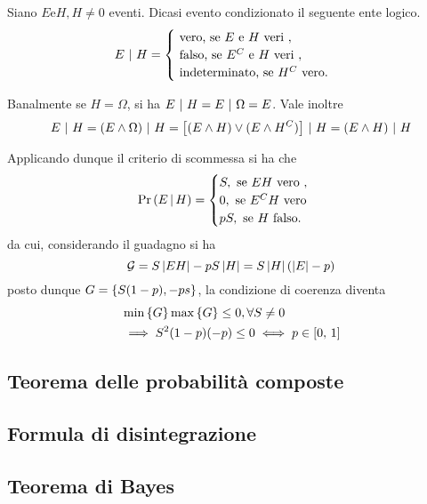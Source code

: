 \documentclass{subfiles}
\begin{document}
\begin{Definition*}
    Siano \(E \text{e} H, H \neq 0\) eventi.
    Dicasi evento condizionato il seguente ente logico.
    \[E \Given H = \begin{cases}
            \text{vero, se} E \text{e} H \text{veri},      \\
            \text{falso, se} E^{C} \text{e} H \text{veri}, \\
            \text{indeterminato, se} H^{C} \text{vero.}
        \end{cases}\]
\end{Definition*}

Banalmente se \(H = \Omega\), si ha \(E \operatorname{\, \vert \,} H = E \operatorname{\, \vert \,} \Omega = E\).
Vale inoltre
\[
    E \operatorname{\, \vert \,} H = (E \land \Omega) \operatorname{\, \vert \,} H = \left[(E \land H) \lor (E \land H^{C})\right] \operatorname{\, \vert \,} H = (E \land H) \operatorname{\, \vert \,} H
\]

Applicando dunque il criterio di scommessa si ha che
\[
    \Prob{E}[H] = \begin{cases}
        S, \text{se} EH \text{vero},    \\
        0, \text{se} E^{C}H \text{vero} \\
        pS, \text{se} H \text{falso.}
    \end{cases}\]
da cui, considerando il guadagno si ha
\[
    \mathcal{G} = S \left\vert EH \right\vert - pS\left\vert H \right\vert = S\left\vert H \right\vert (\left\vert E \right\vert - p)
\]
posto dunque \(G = \Set{S(1 - p), -ps}\), la condizione di coerenza diventa
\[\begin{aligned}
         & \Min{G}\Max{G} \le 0, \forall S \neq 0                   \\
         & \implies S^{2}(1 - p)(-p) \le 0 \iff p \in \Range*{0}{1}
    \end{aligned}\]

\subsection{Teorema delle probabilità composte}


\subsection{Formula di disintegrazione}


\subsection{Teorema di Bayes}

\end{document}
